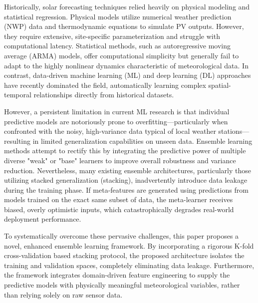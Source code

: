 \documentclass[conference]{IEEEtran}
\begin{document}
Historically, solar forecasting techniques relied heavily on physical modeling and statistical regression. Physical models utilize numerical weather prediction (NWP) data and thermodynamic equations to simulate PV outputs. However, they require extensive, site-specific parameterization and struggle with computational latency. Statistical methods, such as autoregressive moving average (ARMA) models, offer computational simplicity but generally fail to adapt to the highly nonlinear dynamics characteristic of meteorological data. In contrast, data-driven machine learning (ML) and deep learning (DL) approaches have recently dominated the field, automatically learning complex spatial-temporal relationships directly from historical datasets.

However, a persistent limitation in current ML research is that individual predictive models are notoriously prone to overfitting—particularly when confronted with the noisy, high-variance data typical of local weather stations—resulting in limited generalization capabilities on unseen data. Ensemble learning methods attempt to rectify this by integrating the predictive power of multiple diverse "weak" or "base" learners to improve overall robustness and variance reduction. Nevertheless, many existing ensemble architectures, particularly those utilizing stacked generalization (stacking), inadvertently introduce data leakage during the training phase. If meta-features are generated using predictions from models trained on the exact same subset of data, the meta-learner receives biased, overly optimistic inputs, which catastrophically degrades real-world deployment performance.

To systematically overcome these pervasive challenges, this paper proposes a novel, enhanced ensemble learning framework. By incorporating a rigorous K-fold cross-validation based stacking protocol, the proposed architecture isolates the training and validation spaces, completely eliminating data leakage. Furthermore, the framework integrates domain-driven feature engineering to supply the predictive models with physically meaningful meteorological variables, rather than relying solely on raw sensor data.
\end{document}

